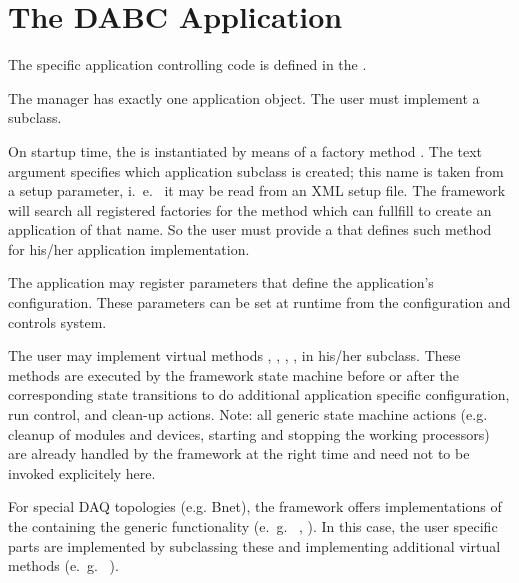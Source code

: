 \section{The DABC Application}
\label{prog_plugin_applicaton}
The specific application controlling code is defined in 
   the .   
\begin{compactenum}
\item  The manager has exactly one application object. 
      The user must implement a  subclass.
\item  On startup time, the  is instantiated
by means of a factory method 
      .
The text argument  specifies which
application subclass is created; this name is taken from a setup parameter, i.~e.~ it may be read from an XML setup file. The framework will search all
registered factories for the method which can fullfill to create an application
of that name. So the user must provide a  that defines such method for his/her application implementation.
      
\item  The application  may register parameters that 
      define the application's configuration. These parameters can be set at 
      runtime from the configuration and controls system.
     
\item  The user may implement virtual methods  ,  
      , , 
      ,  in his/her 
       subclass. These methods are executed by the 
      framework state machine before or after the corresponding state 
      transitions to do additional application specific configuration, 
      run control, and clean-up actions. Note: all generic state machine 
      actions (e.g. cleanup of modules and devices, starting 
      and stopping the working processors) are already handled by 
      the framework at the right time and need not to be invoked explicitely here.

\item   For special DAQ topologies (e.g. Bnet), the framework offers 
      implementations of the  containing the 
      generic functionality (e.~g.~ , ). 
      In this case, the user specific parts are implemented by subclassing 
      these and implementing additional virtual methods (e.~g.~ ).    
\end{compactenum}







